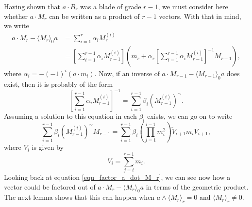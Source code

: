 \documentclass{birkjour}
\theoremstyle{definition}
\theoremstyle{remark}
\numberwithin{equation}{section}
\begin{document}
Having shown that $a\cdot B_r$ was a blade of grade $r-1$, we must consider here whether $a\cdot M_r$ can be written
as a product of $r-1$ vectors.  With that in mind, we write
\begin{align}
a\cdot M_r - \langle M_r\rangle_0a &= \sum_{i=1}^r\alpha_i M_r^{(i)}\nonumber \\
 &= \left[\sum_{i=1}^{r-1}\alpha_iM_{r-1}^{(i)}\right]\left(m_r + \alpha_r\left[\sum_{i=1}^{r-1}\alpha_iM_{r-1}^{(i)}\right]^{-1}M_{r-1}\right),\label{equ_factor_a_dot_M_r}
\end{align}
where $\alpha_i=-(-1)^i(a\cdot m_i)$.  Now, if an inverse of $a\cdot M_{r-1}-\langle M_{r-1}\rangle_0a$ does exist, then
it is probably of the form
\begin{equation*}
\left[\sum_{i=1}^{r-1}\alpha_iM_{r-1}^{(i)}\right]^{-1} = \sum_{i=1}^{r-1}\beta_i\left(M_{r-1}^{(i)}\right)^{\sim}.
\end{equation*}
Assuming a solution to this equation in each $\beta_i$ exists, we can go on to write
\begin{equation*}
\sum_{i=1}^{r-1}\beta_i\left(M_{r-1}^{(i)}\right)^{\sim}M_{r-1} = \sum_{i=1}^{r-1}\beta_i \left(\prod_{j=1}^{i-1}m_i^2\right)\tilde{V}_{i+1}m_iV_{i+1},
\end{equation*}
where $V_i$ is given by
\begin{equation*}
V_i = \sum_{j=i}^{r-1} m_i.
\end{equation*}
Looking back at equation \eqref{equ_factor_a_dot_M_r}, we can see now how a vector could be factored
out of $a\cdot M_r - \langle M_r\rangle_0a$ in terms of the geometric product.
The next lemma shows that this can happen when $a\wedge\langle M_r\rangle_r=0$ and $\langle M_r\rangle_r\neq 0$.
\end{document}
